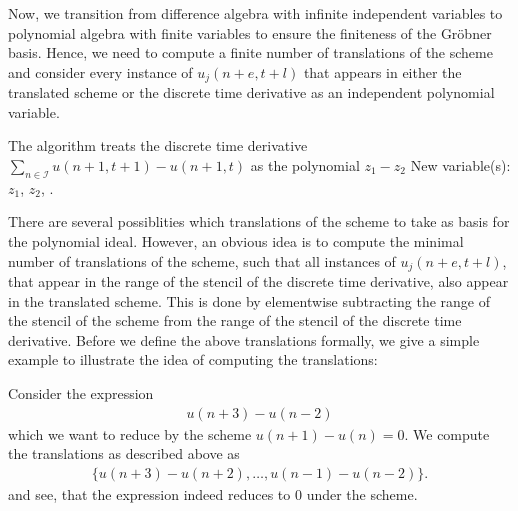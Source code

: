 \documentclass[runningheads]{llncs}
\newcommand{\1}{\chi}
\begin{document}
Now, we transition from difference algebra with infinite independent variables to polynomial algebra with finite variables to ensure the finiteness of the Gr{\"o}bner basis. 
Hence, we need to compute a finite number of translations of the scheme and consider every instance of \(u_j(n+e,t+l)\) that appears in either the translated scheme or the discrete time derivative as an independent polynomial variable.
\begin{example}
	The algorithm treats the discrete time derivative \(\sum_{n\in\mathcal{I}}u(n+1,t+1)-u(n+1,t)\)
	as the polynomial \(z_1-z_2\)
{\color{blue} New variable(s): \(z_1\), \(z_2\),  }
.
\end{example}
There are several possiblities which translations of the scheme to take as basis for the polynomial ideal. However, an obvious idea is to compute the minimal number of translations of the scheme, such that all instances of \(u_j(n+e,t+l)\), that appear in the range of the stencil of the discrete time derivative, also appear in the translated scheme.
This is done by elementwise subtracting the range of the stencil of the scheme from the range of the stencil of the discrete time derivative. Before we define the above translations formally, we give a simple example to illustrate the idea of computing the translations:
\begin{example}
	Consider the expression
	\begin{gather*}
		u(n+3)-u(n-2)
	\end{gather*}
	which we want to reduce by the scheme \(u(n+1)-u(n)=0\). We compute the translations as described above as
	\begin{gather*}
		\{u(n+3)-u(n+2),\dots,u(n-1)-u(n-2)\}.
	\end{gather*}
	and see, that the expression indeed reduces to \(0\) under the scheme.
\end{example}
\end{document}
